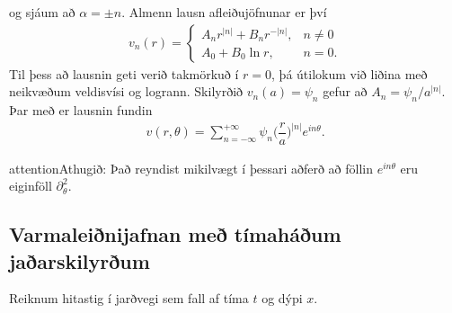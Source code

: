 \documentclass[a4paper,10pt,icelandic]{sphinxmanual}
\begin{document}
og sjáum að \(\alpha=\pm n\). Almenn lausn
afleiðujöfnunar er því
\begin{equation*}
\begin{split}v_n(r)=
 \begin{cases}
 A_nr^{|n|}+B_nr^{-|n|}, &n\neq 0\\
 A_0+B_0\ln r, &n=0.
 \end{cases}\end{split}
\end{equation*}
Til þess að lausnin geti verið takmörkuð í \(r=0\), þá útilokum við liðina með neikvæðum veldisvísi og logrann. Skilyrðið
\(v_n(a)={\psi}_n\) gefur að \(A_n={\psi}_n/a^{|n|}\). Þar með
er lausnin fundin
\begin{equation*}
\begin{split}v(r,\theta)=\sum\limits_{n=-\infty}^{+\infty}
 \psi_n \bigg(\dfrac r a\bigg)^{|n|}e^{in\theta}.\end{split}
\end{equation*}
\begin{sphinxadmonition}{attention}{Athugið:}
Það reyndist mikilvægt í þessari aðferð að föllin \(e^{in\theta}\) eru eiginföll \(\partial_\theta^2\).
\end{sphinxadmonition}


\subsection{Varmaleiðnijafnan með tímaháðum jaðarskilyrðum}
\label{\detokenize{Kafli03:varmaleinijafnan-me-timahaum-jaarskilyrum}}
Reiknum hitastig í jarðvegi sem fall af tíma \(t\) og dýpi \(x\).
\end{document}
